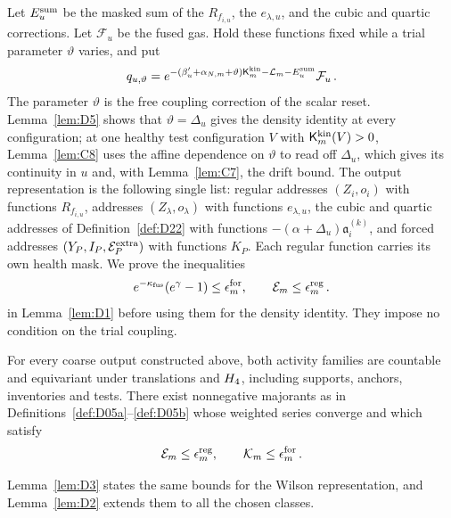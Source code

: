 Let $E_u^{\rm sum}$ be the masked sum of the $R_{f_{i,u}}$, the $e_{\lambda,u}$, and the cubic and quartic corrections. Let $\mathcal F_u$ be the fused gas. Hold these functions fixed while a trial parameter $\vartheta$ varies, and put
\begin{equation*}
q_{u,\vartheta}=e^{-(\beta'_u+\alpha_{N,m}+\vartheta)\mathsf K_m^{\rm kin}-\mathcal L_m-E_u^{\rm sum}}\mathcal F_u\,.
\end{equation*}
The parameter $\vartheta$ is the free coupling correction of the scalar reset. Lemma~\ref{lem:D5} shows that $\vartheta=\Delta_u$ gives the density identity at every configuration; at one healthy test configuration $V$ with $\mathsf K^{\rm kin}_m(V)>0$, Lemma~\ref{lem:C8} uses the affine dependence on $\vartheta$ to read off $\Delta_u$, which gives its continuity in $u$ and, with Lemma~\ref{lem:C7}, the drift bound.
The output representation is the following single list: regular addresses $(Z_i,o_i)$ with functions $R_{f_{i,u}}$, addresses $(Z_\lambda,o_\lambda)$ with functions $e_{\lambda,u}$, the cubic and quartic addresses of Definition~\ref{def:D22} with functions $-(\alpha+\Delta_u)\mathfrak a_i^{(k)}$, and forced addresses $(Y_P,I_P,\mathcal E_P^{\rm extra})$ with functions $K_P$. Each regular function carries its own health mask. We prove the inequalities
\begin{equation}\label{eq:D-fusion-small}
e^{-\kappa_{\rm fus}}(e^\gamma-1)\le\epsilon_m^{\rm for},\qquad
\mathcal E_m\le\epsilon_m^{\rm reg}\,.
\end{equation}
in Lemma~\ref{lem:D1} before using them for the density identity. They impose no condition on the trial coupling.

\begin{lemma}\label{lem:D1}
For every coarse output constructed above, both activity families are countable and equivariant under translations and $H_4$, including supports, anchors, inventories and tests. There exist nonnegative majorants as in Definitions~\ref{def:D05a}--\ref{def:D05b} whose weighted series converge and which satisfy
\begin{equation*}
\mathcal E_m\le\epsilon_m^{\rm reg},\qquad
\mathcal K_m\le\epsilon_m^{\rm for}\,.
\end{equation*}
\end{lemma}
Lemma~\ref{lem:D3} states the same bounds for the Wilson representation, and Lemma~\ref{lem:D2} extends them to all the chosen classes.


